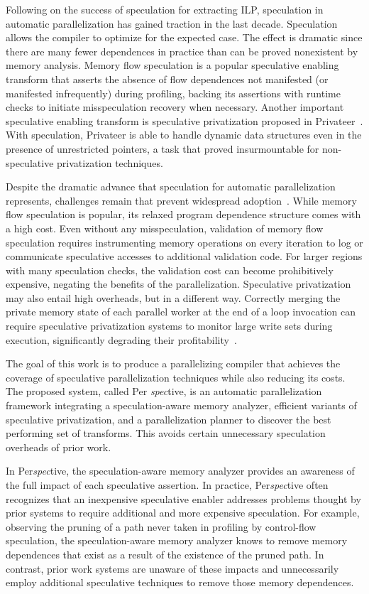 Following on the success of speculation for extracting ILP,
speculation in automatic parallelization has gained traction in the
last decade.  Speculation allows the compiler to optimize for the
expected case.  The effect is dramatic since there are many
fewer dependences in practice than can be proved nonexistent by memory
analysis.  Memory flow speculation is a popular speculative enabling
transform that asserts the absence of flow dependences not manifested
(or manifested infrequently) during profiling, backing its assertions
with runtime checks to initiate misspeculation recovery when
necessary.  Another important speculative enabling transform is
speculative privatization proposed in
Privateer~\cite{johnson:12:pldi}.  With speculation,
Privateer is able to handle dynamic data structures even in the
presence of unrestricted pointers, a task that proved insurmountable
for non-speculative privatization techniques.

Despite the dramatic advance that speculation for automatic
parallelization represents, challenges remain that prevent widespread
adoption~\cite{cascaval:08:stmtoy:short,prabhu:03:ppopp,kelsey:09:cgo}.
While memory flow speculation is popular, its relaxed program
dependence structure comes with a high cost.  Even without any
misspeculation, validation of memory flow speculation requires
instrumenting memory operations on every iteration to log or
communicate speculative accesses to additional validation code.  For
larger regions with many speculation checks, the validation cost can
become prohibitively expensive, negating the benefits of the
parallelization.  Speculative privatization may also entail high
overheads, but in a different way.  Correctly merging the private memory
state of each parallel worker at the end of a loop invocation can
require speculative privatization systems to monitor large write sets
during execution, significantly degrading their
profitability~\cite{kim:12:cgo,johnson:12:pldi,rauchwerger:99:pds}.

The goal of this work is to produce a parallelizing compiler that
achieves the coverage of speculative parallelization techniques while
also reducing its costs.  The proposed system, called Per{\em
  spec}tive, is an automatic parallelization framework integrating a
speculation-aware memory analyzer, efficient variants of speculative
privatization, and a parallelization planner to discover the best
performing set of transforms.  This avoids certain unnecessary
speculation overheads of prior work.

In Per{\em spec}tive, the speculation-aware memory analyzer provides
an awareness of the full impact of each speculative assertion.  In
practice, Per{\em spec}tive often recognizes that an inexpensive
speculative enabler addresses problems thought by prior systems to
require additional and more expensive speculation.  For example,
observing the pruning of a path never taken in profiling by
control-flow speculation, the speculation-aware memory analyzer knows
to remove memory dependences that exist as a result of the existence
of the pruned path.  In contrast, prior work systems are unaware of
these impacts and unnecessarily employ additional speculative
techniques to remove those memory dependences.


